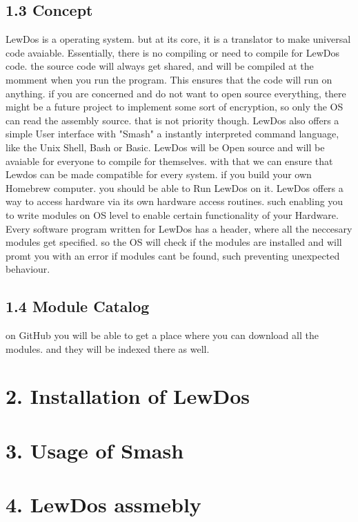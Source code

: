 \documentclass[12pt, letterpaper]{article}
\begin{document}
\subsection*{1.3 Concept}
LewDos is a operating system. but at its core, it is a translator to make universal code avaiable. Essentially, there is no compiling or need to compile for LewDos code.
the source code will always get shared, and will be compiled at the momment when you run the program. This ensures that the code will run on anything. if you are concerned and do not want
to open source everything, there might be a future project to implement some sort of encryption, so only the OS can read the assembly source. that is not priority though.
LewDos also offers a simple User interface with "Smash" a instantly interpreted command language, like the Unix Shell, Bash or Basic. LewDos will be Open source and will be avaiable for 
everyone to compile for themselves. with that we can ensure that Lewdos can be made compatible for every system. if you build your own Homebrew computer. you should be able to Run LewDos on it.
LewDos offers a way to access hardware via its own hardware access routines. such enabling you to write modules on OS level to enable certain functionality of your Hardware.
Every software program written for LewDos has a header, where all the neccesary modules get specified. so the OS will check if the modules are installed and will promt you with an error
if modules cant be found, such preventing unexpected behaviour.
\subsection*{1.4 Module Catalog}
on GitHub you will be able to get a place where you can download all the modules. and they will be indexed there as well.
\section*{2. Installation of LewDos}
\section*{3. Usage of Smash}
\newpage
\section*{4. LewDos assmebly}
\end{document}
